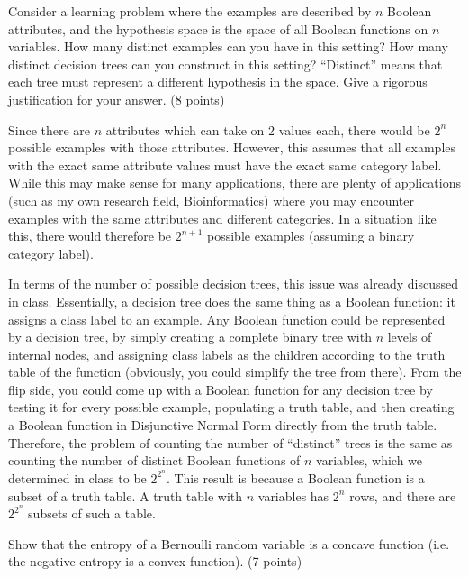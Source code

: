 \documentclass[fleqn]{homework}
\begin{document}
  \begin{problem}{4}
    \begin{question}
      Consider a learning problem where the examples are described by $n$
      Boolean attributes, and the hypothesis space is the space of all Boolean
      functions on $n$ variables.  How many distinct examples can you have in
      this setting?  How many distinct decision trees can you construct in this
      setting?  ``Distinct'' means that each tree must represent a different
      hypothesis in the space.  Give a rigorous justification for your
      answer. (8 points)
    \end{question}

    Since there are $n$ attributes which can take on 2 values each, there would
    be $2^n$ possible examples with those attributes.  However, this assumes
    that all examples with the exact same attribute values must have the exact
    same category label.  While this may make sense for many applications, there
    are plenty of applications (such as my own research field, Bioinformatics)
    where you may encounter examples with the same attributes and different
    categories.  In a situation like this, there would therefore be $2^{n+1}$
    possible examples (assuming a binary category label).

    In terms of the number of possible decision trees, this issue was already
    discussed in class.  Essentially, a decision tree does the same thing as a
    Boolean function: it assigns a class label to an example.  Any Boolean
    function could be represented by a decision tree, by simply creating a
    complete binary tree with $n$ levels of internal nodes, and assigning class
    labels as the children according to the truth table of the function
    (obviously, you could simplify the tree from there).  From the flip side,
    you could come up with a Boolean function for any decision tree by testing
    it for every possible example, populating a truth table, and then creating a
    Boolean function in Disjunctive Normal Form directly from the truth table.
    Therefore, the problem of counting the number of ``distinct'' trees is the
    same as counting the number of distinct Boolean functions of $n$ variables,
    which we determined in class to be $2^{2^n}$.  This result is because a
    Boolean function is a subset of a truth table.  A truth table with $n$
    variables has $2^n$ rows, and there are $2^{2^n}$ subsets of such a table.
  \end{problem}

  \begin{problem}{5}
    \begin{question}
      Show that the entropy of a Bernoulli random variable is a concave function
      (i.e. the negative entropy is a convex function). (7 points)
    \end{question}
  \end{problem}
\end{document}
